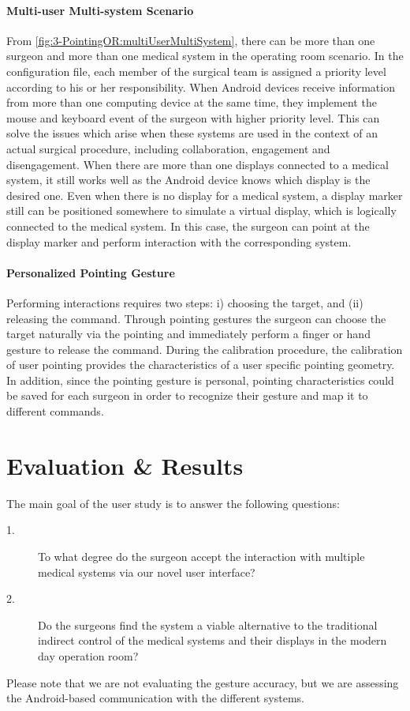 {\paragraph{Multi-user Multi-system Scenario}
From \figurename{\ref{fig:3-PointingOR:multiUserMultiSystem}}, there can be more than one surgeon and more than one medical system in the operating room scenario. In the configuration file, each member of the surgical team is assigned a priority level according to his or her responsibility. When Android devices receive information from more than one computing device at the same time, they implement the mouse and keyboard event of the surgeon with higher priority level. This can solve the issues which arise when these systems are used in the context of an actual surgical procedure, including collaboration, engagement and disengagement. When there are more than one displays connected to a medical system, it still works well as the Android device knows which display is the desired one. Even when there is no display for a medical system, a display marker still can be positioned somewhere to simulate a virtual display, which is logically connected to the medical system. In this case, the surgeon can point at the display marker and perform interaction with the corresponding system.
\paragraph{Personalized Pointing Gesture}
Performing interactions requires two steps: i) choosing the target, and (ii) releasing the command. Through pointing gestures the surgeon can choose the target naturally via the pointing and immediately perform a finger or hand gesture to release the command. During the calibration procedure, the calibration of user pointing provides the characteristics of a user specific pointing geometry. In addition, since the pointing gesture is personal, pointing characteristics could be saved for each surgeon in order to recognize their gesture and map it to different commands.

\section{Evaluation \& Results}
The main goal of the user study is to answer the following questions: 
\begin{description}
	\item[1.] To what degree do the surgeon accept the interaction with multiple medical systems via our novel user interface?
	\item[2.] Do the surgeons find the system a viable alternative to the traditional indirect control of the medical systems and their displays in the modern day operation room?
\end{description}
Please note that we are not evaluating the gesture accuracy, but we are assessing the Android-based communication with the different systems. 
}
